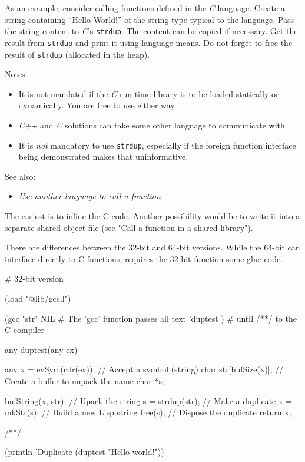 As an example, consider calling functions defined in the
\emph{C} language. Create a string containing ``Hello World!''
of the string type typical to the language. Pass the string content to
\emph{C}'s \texttt{strdup}. The content can be copied if
necessary. Get the result from \texttt{strdup} and print it using
language means. Do not forget to free the result of \texttt{strdup}
(allocated in the heap).

Notes:

\begin{itemize}
\item
  It is not mandated if the \emph{C} run-time library is to be
  loaded statically or dynamically. You are free to use either way.
\item \emph{C++} and \emph{C} solutions can take some other language
  to communicate with.
\item It is \emph{not} mandatory to use \texttt{strdup}, especially if
  the foreign function interface being demonstrated makes that
  uninformative.
\end{itemize}

See also:

\begin{itemize}
\item
  \emph{Use another language to call a function}
\end{itemize}



\begin{wideverbatim}

The easiest is to inline the C code. Another possibility would be to write it
into a separate shared object file (see "Call a function in a shared library").

There are differences between the 32-bit and 64-bit versions. While the 64-bit
can interface directly to C functions, requires the 32-bit function some glue
code.

# 32-bit version

(load "@lib/gcc.l")

(gcc "str" NIL                # The 'gcc' function passes all text
   'duptest )                 # until /**/ to the C compiler

any duptest(any ex) {
   any x = evSym(cdr(ex));    // Accept a symbol (string)
   char str[bufSize(x)];      // Create a buffer to unpack the name
   char *s;

   bufString(x, str);         // Upack the string
   s = strdup(str);           // Make a duplicate
   x = mkStr(s);              // Build a new Lisp string
   free(s);                   // Dispose the duplicate
   return x;
}
/**/

(println 'Duplicate (duptest "Hello world!"))

\end{wideverbatim}

